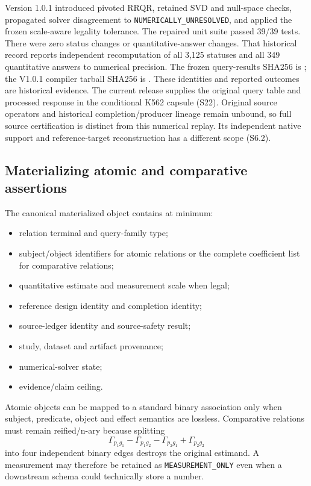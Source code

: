 \documentclass[11pt]{article}
\begin{document}
Version 1.0.1 introduced pivoted RRQR, retained SVD and null-space checks, propagated solver disagreement to \texttt{NUMERICALLY\_UNRESOLVED}, and applied the frozen scale-aware legality tolerance. The repaired unit suite passed 39/39 tests. There were zero status changes or quantitative-answer changes. That historical record reports independent recomputation of all 3,125 statuses and all 349 quantitative answers to numerical precision. The frozen query-results SHA256 is \texttt{}; the V1.0.1 compiler tarball SHA256 is \texttt{}. These identities and reported outcomes are historical evidence. The current release supplies the original query table and processed response in the conditional K562 capsule (S22). Original source operators and historical completion/producer lineage remain unbound, so full source certification is distinct from this numerical replay. Its independent native support and reference-target reconstruction has a different scope (S6.2).



\subsection{Materializing atomic and comparative assertions}
The canonical materialized object contains at minimum:
\begin{itemize}
\item relation terminal and query-family type;
\item subject/object identifiers for atomic relations or the complete coefficient list for comparative relations;
\item quantitative estimate and measurement scale when legal;
\item reference design identity and completion identity;
\item source-ledger identity and source-safety result;
\item study, dataset and artifact provenance;
\item numerical-solver state;
\item evidence/claim ceiling.
\end{itemize}

Atomic objects can be mapped to a standard binary association only when subject, predicate, object and effect semantics are lossless. Comparative relations must remain reified/n-ary because splitting
\[
\Gamma_{p_1g_1}-\Gamma_{p_1g_2}-\Gamma_{p_2g_1}+\Gamma_{p_2g_2}
\]
into four independent binary edges destroys the original estimand. A measurement may therefore be retained as \texttt{MEASUREMENT\_ONLY} even when a downstream schema could technically store a number.
\end{document}
